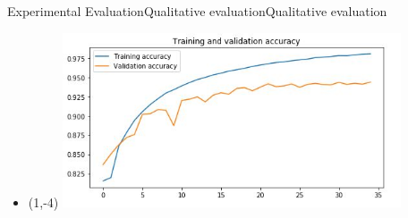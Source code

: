 \documentclass{beamer}
\begin{document}
\begin{CJK}{UTF8}{}
\begin{frame}{Experimental Evaluation}{Qualitative evaluationQualitative evaluation}
	\begin{itemize}
	\item{
		\begin{textblock}{3}(1,-4)
		\includegraphics[width=10cm]{accuracy.jpg}
		\end{textblock}
	}	
	\end{itemize}
\end{frame}

\end{CJK}
\end{document}
